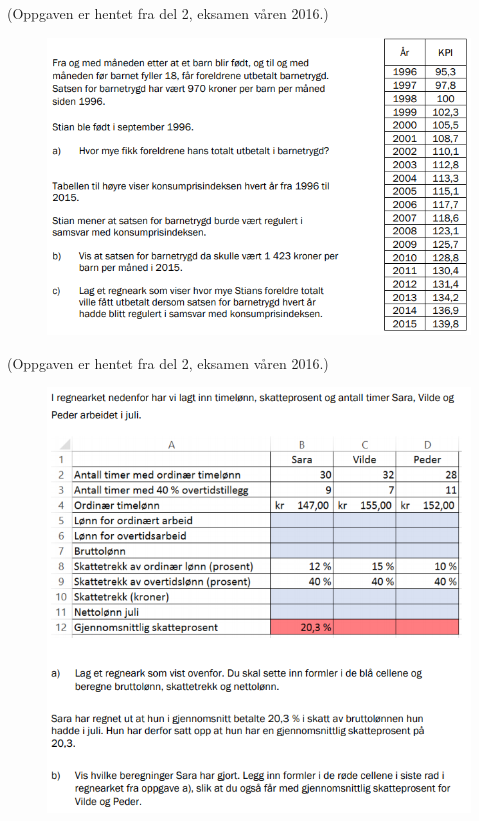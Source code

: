 \newpage
{}
(Oppgaven er hentet fra del 2, eksamen våren 2016.)
\begin{figure}
	\centering
	\includegraphics[scale=0.75]{v16_d2_5}
\end{figure}
\newpage
{}
(Oppgaven er hentet fra del 2, eksamen våren 2016.)
\begin{figure}
	\centering
	\includegraphics[scale=0.75]{v16_d2_6}
\end{figure}
